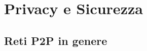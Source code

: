 \chapter{Privacy e Sicurezza}\label{privacy-e-sicurezza}

\section{Reti P2P in genere}\label{reti-p2p-in-genere}
